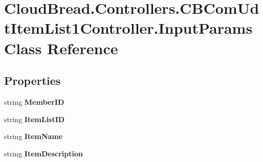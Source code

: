 \hypertarget{class_cloud_bread_1_1_controllers_1_1_c_b_com_udt_item_list1_controller_1_1_input_params}{}\section{Cloud\+Bread.\+Controllers.\+C\+B\+Com\+Udt\+Item\+List1\+Controller.\+Input\+Params Class Reference}
\label{class_cloud_bread_1_1_controllers_1_1_c_b_com_udt_item_list1_controller_1_1_input_params}
\subsection*{Properties}
\begin{DoxyCompactItemize}
\item 
string {\bfseries Member\+ID}\hypertarget{class_cloud_bread_1_1_controllers_1_1_c_b_com_udt_item_list1_controller_1_1_input_params_aefe5c8c92140de3b72cc5033e2559b6c}{}\label{class_cloud_bread_1_1_controllers_1_1_c_b_com_udt_item_list1_controller_1_1_input_params_aefe5c8c92140de3b72cc5033e2559b6c}

\item 
string {\bfseries Item\+List\+ID}\hypertarget{class_cloud_bread_1_1_controllers_1_1_c_b_com_udt_item_list1_controller_1_1_input_params_a740d4e0657cb37f12bdacc6660d74bb5}{}\label{class_cloud_bread_1_1_controllers_1_1_c_b_com_udt_item_list1_controller_1_1_input_params_a740d4e0657cb37f12bdacc6660d74bb5}

\item 
string {\bfseries Item\+Name}\hypertarget{class_cloud_bread_1_1_controllers_1_1_c_b_com_udt_item_list1_controller_1_1_input_params_abd815de9bebbcc10271c255582122f39}{}\label{class_cloud_bread_1_1_controllers_1_1_c_b_com_udt_item_list1_controller_1_1_input_params_abd815de9bebbcc10271c255582122f39}

\item 
string {\bfseries Item\+Description}\hypertarget{class_cloud_bread_1_1_controllers_1_1_c_b_com_udt_item_list1_controller_1_1_input_params_aa656ee374dfa31edf29427c5cf130001}{}\label{class_cloud_bread_1_1_controllers_1_1_c_b_com_udt_item_list1_controller_1_1_input_params_aa656ee374dfa31edf29427c5cf130001}


\end{DoxyCompactItemize}
